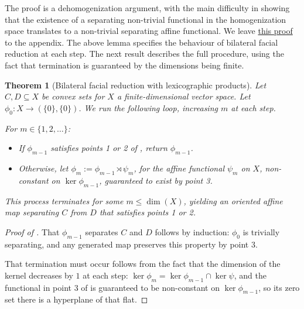 \documentclass{article}
\theoremstyle{plain}
\newtheorem{theorem}{Theorem}[section]
\theoremstyle{definition}
\theoremstyle{remark}
\begin{document}
The proof is a dehomogenization argument,
with the main difficulty in showing that the existence of a separating non-trivial functional
in the homogenization space translates to a non-trivial separating affine functional. We leave \hyperlink{loc:alternatives_for_a_separating_affine_oriented_map.proof}{this proof} to the appendix.
The above lemma specifies the behaviour of bilateral facial reduction at each step. The next result describes the full procedure, using the fact that
termination is guaranteed by the dimensions being finite.
\begin{theorem}[Bilateral facial reduction with lexicographic products]
\label{loc:bilateral_facial_reduction_with_lexicographic_products.statement}
Let $C, D \subseteq X$ be convex sets for $X$ a finite-dimensional vector space. 
Let $\phi_0: X \to (\{ 0 \},\{ 0 \})$. We run the following loop, increasing $m$
at each step.

For  $m \in \{1, 2, \ldots\}$:
\begin{itemize}
\item If $\phi_{m-1}$ satisfies points 1 or 2 of , return $\phi_{m-1}$.
\item Otherwise, let $\phi_m :=  \phi_{m-1} \rtimes \psi_m$, for the affine functional $\psi_m$ on $X$, non-constant on $\ker\phi_{m-1}$, guaranteed to exist by  point 3.
\end{itemize}

This process terminates for some $m \le \dim(X)$, yielding an oriented
affine map separating $C$ from $D$ that satisfies  points 1 or 2.
\end{theorem}
\begin{proof}[\hypertarget{loc:bilateral_facial_reduction_with_lexicographic_products.proof}{}Proof of ]

That $\phi_{m-1}$ separates $C$ and $D$ follows by induction: 
$\phi_0$ is trivially separating, and any generated map preserves this
property by  point 3. 

That termination must occur follows from the fact that the dimension of the kernel
decreases by $1$ at each step: $\ker\phi_m = \ker\phi_{m-1} \cap \ker\psi$, and 
the functional in point 3 of  is guaranteed to be non-constant on $\ker\phi_{m-1}$, so its zero set there is a hyperplane of that flat.
\end{proof}
\end{document}
